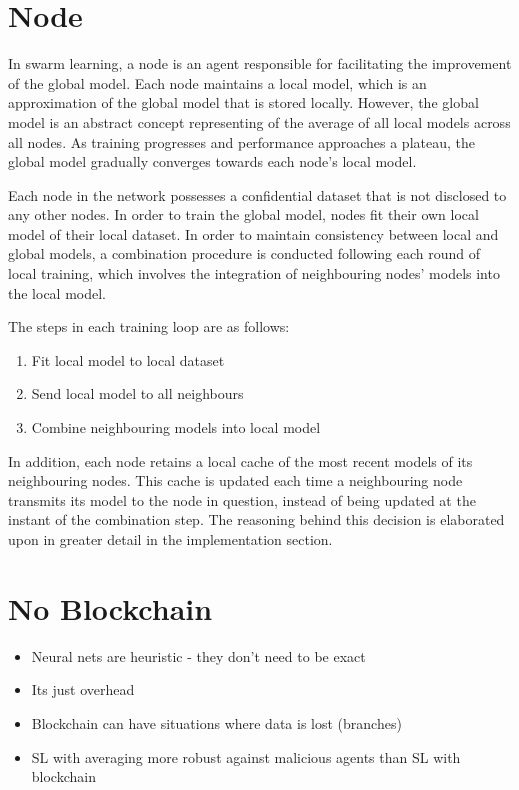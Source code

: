 \section{Node}
In swarm learning, a node is an agent responsible for facilitating the improvement of the global model. Each node maintains a local model, which is an approximation of the global model that is stored locally. However, the global model is an abstract concept representing of the average of all local models across all nodes. As training progresses and performance approaches a plateau, the global model gradually converges towards each node's local model.

Each node in the network possesses a confidential dataset that is not disclosed to any other nodes. In order to train the global model, nodes fit their own local model of their local dataset. In order to maintain consistency between local and global models, a combination procedure is conducted following each round of local training, which involves the integration of neighbouring nodes' models into the local model.

The steps in each training loop are as follows:
\begin{enumerate}
	\item Fit local model to local dataset
	\item Send local model to all neighbours
	\item Combine neighbouring models into local model
\end{enumerate}

In addition, each node retains a local cache of the most recent models of its neighbouring nodes. This cache is updated each time a neighbouring node transmits its model to the node in question, instead of being updated at the instant of the combination step. The reasoning behind this decision is elaborated upon in greater detail in the implementation section.

\section{No Blockchain}
\begin{itemize}
	\item Neural nets are heuristic - they don't need to be exact
	\item Its just overhead
	\item Blockchain can have situations where data is lost (branches) \checkme
	\item SL with averaging more robust against malicious agents than SL with blockchain  \checkme
\end{itemize}

